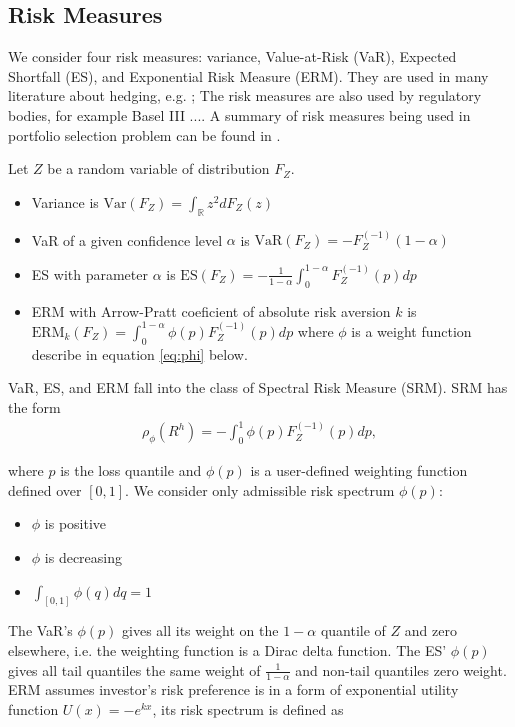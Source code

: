 \subsection{Risk Measures}\label{subsec:spectral-risk-measures}
We consider four risk measures: variance, Value-at-Risk (VaR), Expected Shortfall (ES), and Exponential Risk Measure (ERM).
They are used in many literature about hedging, e.g. ;
The risk measures are also used by regulatory bodies,
for example Basel III ....
A summary of risk measures being used in portfolio selection problem can be found in \citet{hardle2008applied}.\medskip
\medskip


Let $Z$ be a random variable of distribution $F_Z$.
\begin{itemize}
	\item Variance is $\text{Var}(F_Z) = \int_\mathbb{R}z^2 dF_Z(z)$
	\item VaR of a given confidence level $\alpha$ is $\text{VaR}(F_Z) = -F_{Z}^{(-1)}(1-\alpha)$
	\item ES with parameter $\alpha$ is $\text{ES}(F_Z) = -\frac{1}{1-\alpha}\int_0^{1-\alpha}F_Z^{(-1)}(p)dp$
	\item ERM with Arrow-Pratt coeficient of absolute risk aversion $k$ is $\text{ERM}_k(F_Z) = \int_0^{1-\alpha}\phi(p) F_Z^{(-1)}(p)dp$ where $\phi$ is a weight function describe in equation \ref{eq:phi} below.
	\end{itemize}\medskip

VaR, ES, and ERM fall into the class of Spectral Risk Measure (SRM).
SRM has the form \citep{Acerbi2002}%
\begin{align}
	\rho_\phi(R^h) = - \int_0^1 \phi(p) F_{Z}^{(-1)}(p)d p,
	\end{align}

where $p$ is the loss quantile and $\phi(p)$ is a user-defined weighting function defined over $[0,1]$. \medskip
We consider only admissible risk spectrum  $\phi(p)$:
\begin{itemize}
	\item $\phi$ is positive
	\item $\phi$ is decreasing
	\item $\int_{[0,1]}\phi(q)dq = 1$
	\end{itemize}\medskip

The VaR's $\phi(p)$ gives all its weight on the $1-\alpha$ quantile of $Z$ and zero elsewhere,
i.e. the weighting function is a Dirac delta function.
The ES' $\phi(p)$ gives all tail quantiles the same weight of $\frac{1}{1-\alpha}$ and non-tail quantiles zero weight.
ERM assumes investor's risk preference is in a form of exponential utility function $U(x)=-e^{kx}$,
its risk spectrum is defined as


